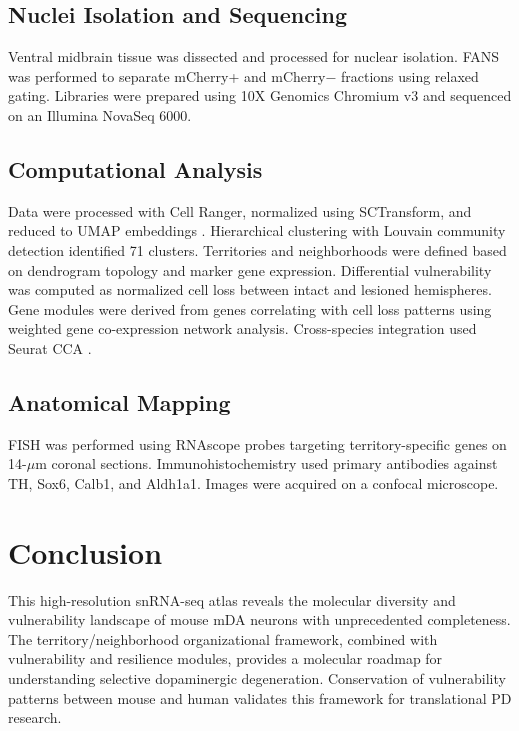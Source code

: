 \documentclass[11pt]{article}
\begin{document}
\subsection{Nuclei Isolation and Sequencing}

Ventral midbrain tissue was dissected and processed for nuclear isolation. FANS was performed to separate mCherry+ and mCherry$-$ fractions using relaxed gating. Libraries were prepared using 10X Genomics Chromium v3 and sequenced on an Illumina NovaSeq 6000.

\subsection{Computational Analysis}

Data were processed with Cell Ranger, normalized using SCTransform, and reduced to UMAP embeddings \citep{umap_mcinnes2018}. Hierarchical clustering with Louvain community detection identified 71 clusters. Territories and neighborhoods were defined based on dendrogram topology and marker gene expression. Differential vulnerability was computed as normalized cell loss between intact and lesioned hemispheres. Gene modules were derived from genes correlating with cell loss patterns using weighted gene co-expression network analysis. Cross-species integration used Seurat CCA \citep{stuart2019comprehensive}.

\subsection{Anatomical Mapping}

FISH was performed using RNAscope probes targeting territory-specific genes on 14-$\mu$m coronal sections. Immunohistochemistry used primary antibodies against TH, Sox6, Calb1, and Aldh1a1. Images were acquired on a confocal microscope.

\section{Conclusion}

This high-resolution snRNA-seq atlas reveals the molecular diversity and vulnerability landscape of mouse mDA neurons with unprecedented completeness. The territory/neighborhood organizational framework, combined with vulnerability and resilience modules, provides a molecular roadmap for understanding selective dopaminergic degeneration. Conservation of vulnerability patterns between mouse and human validates this framework for translational PD research.



\end{document}

